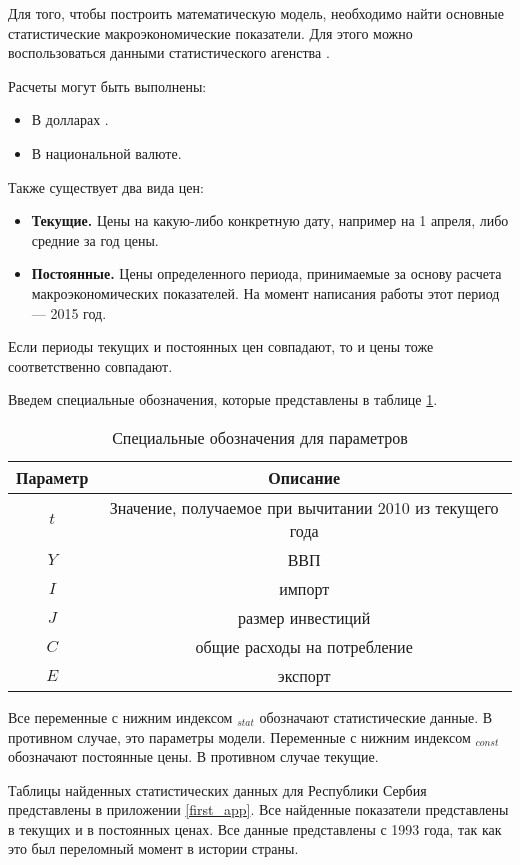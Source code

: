 
Для того, чтобы построить математическую модель, необходимо найти основные статистические макроэкономические показатели.
Для этого можно воспользоваться данными статистического агенства \cite{unstat}.

Расчеты могут быть выполнены:
\begin{itemize}
	\item В долларах .
	\item В национальной валюте.
\end{itemize}

Также существует два вида цен:
\begin{itemize}
	\item \textbf{Текущие.}
	Цены на какую-либо конкретную дату, например на 1 апреля, либо средние за год цены.
	\item \textbf{Постоянные.}
	Цены определенного периода, принимаемые за основу расчета макроэкономических показателей.
	На момент написания работы этот период --- 2015 год.
\end{itemize}
Если периоды текущих и постоянных цен совпадают, то и цены тоже соответственно совпадают.

Введем специальные обозначения, которые представлены в таблице \ref{desig_of_params}.

\begin{table}[]
	\centering
	\begin{tabular}{|c|c|}
	\hline
	\multicolumn{1}{|c|}{Параметр} & \multicolumn{1}{c|}{Описание} \\ \hline
	$t$                          &Значение, получаемое при вычитании 2010 из текущего года\\
	$Y$                          & ВВП                                                   \\
	$I$                          & импорт                                                \\
	$J$                          & размер инвестиций                                     \\
	$C$                          & общие расходы на потребление                          \\
	$E$                          & экспорт                                               \\ \hline
\end{tabular}
\caption{Специальные обозначения для параметров}\label{desig_of_params}
\end{table}

Все переменные с нижним индексом $_{stat}$ обозначают статистические данные.
В противном случае, это параметры модели.
Переменные с нижним индексом $_{const}$ обозначают постоянные цены.
В противном случае текущие.

Таблицы найденных статистических данных для Республики Сербия  представлены в приложении \ref{first_app}.
Все найденные показатели представлены в текущих и в постоянных ценах.
Все данные представлены с 1993 года, так как это был переломный момент в истории страны.
